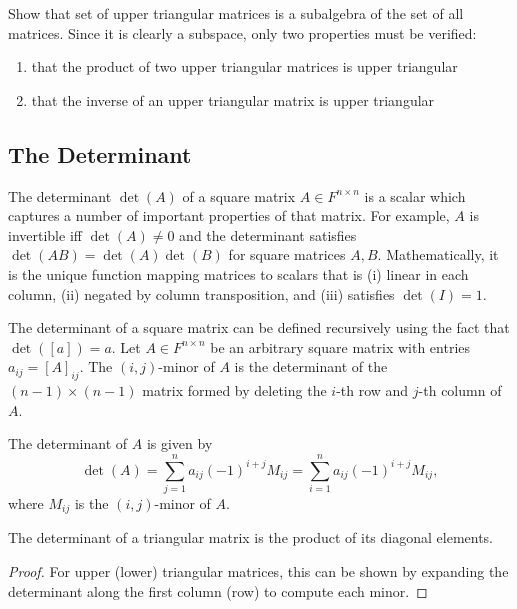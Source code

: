 \begin{problem}
Show that set of upper triangular matrices is a subalgebra of the set of all matrices.
Since it is clearly a subspace, only two properties must be verified:
\begin{enumerate}
\item that the product of two upper triangular matrices is upper triangular
\item that the inverse of an upper triangular matrix is upper triangular
\end{enumerate}
\end{problem}

\subsection{The Determinant}

The determinant $\det (A)$ of a square matrix $A \in F^{n \times n}$ is a scalar which captures a number of important properties of that matrix.
For example, $A$ is invertible iff $\det(A) \neq 0$ and the determinant satisfies $\det(AB) = \det(A) \det(B)$ for square matrices $A,B$.
Mathematically, it is the unique function mapping matrices to scalars that is (i) linear in each column, (ii) negated by column transposition, and (iii) satisfies $\det(I) = 1$.

The determinant of a square matrix can be defined recursively using the fact that $\det \left( [ a ] \right) = a$.
Let $A \in F^{n \times n}$ be an arbitrary square matrix with entries $a_{ij} = [ A ]_{ij}$.
The $(i,j)$-minor of $A$ is the determinant of the $(n-1)\times(n-1)$ matrix formed by deleting the $i$-th row and $j$-th column of $A$.
\begin{fact}
The determinant of $A$ is given by
\begin{equation*}
\det(A) = \sum_{j=1}^n a_{ij} (-1)^{i+j} M_{ij} = \sum_{i=1}^n a_{ij} (-1)^{i+j} M_{ij},
\end{equation*}
where $M_{ij}$ is the $(i,j)$-minor of $A$.
\end{fact}

\begin{theorem}
\label{thm:triangular_determinant}
The determinant of a triangular matrix is the product of its diagonal elements.
\end{theorem}
\begin{proof}
For upper (lower) triangular matrices, this can be shown by expanding the determinant along the first column (row) to compute each minor.
\end{proof}

